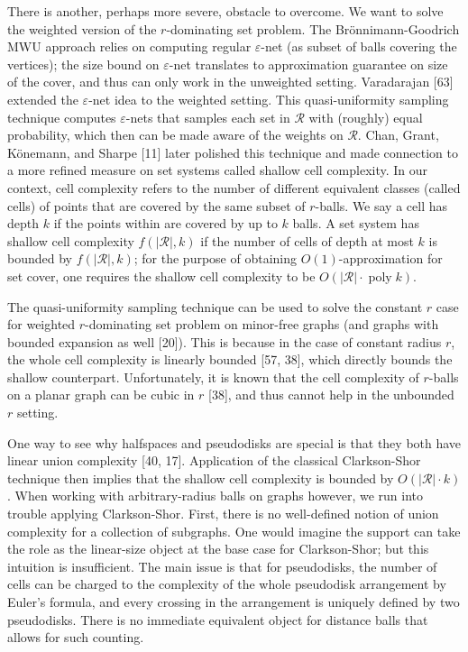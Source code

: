There is another, perhaps more severe, obstacle to overcome. We want to solve the weighted version of the $r$-dominating set problem. The Brönnimann-Goodrich MWU approach relies on computing regular $\varepsilon$-net (as subset of balls covering the vertices); the size bound on $\varepsilon$-net translates to approximation guarantee on size of the cover, and thus can only work in the unweighted setting. Varadarajan [63] extended the $\varepsilon$-net idea to the weighted setting. This quasi-uniformity sampling technique computes $\varepsilon$-nets that samples each set in $\mathcal{R}$ with (roughly) equal probability, which then can be made aware of the weights on $\mathcal{R}$. Chan, Grant, Könemann, and Sharpe [11] later polished this technique and made connection to a more refined measure on set systems called shallow cell complexity. In our context, cell complexity refers to the number of different equivalent classes (called cells) of points that are covered by the same subset of $r$-balls. We say a cell has depth $k$ if the points within are covered by up to $k$ balls. A set system has shallow cell complexity $f(|\mathcal{R}|,k)$ if the number of cells of depth at most $k$ is bounded by $f(|\mathcal{R}|,k)$; for the purpose of obtaining $O(1)$-approximation for set cover, one requires the shallow cell complexity to be $O(|\mathcal{R}|\cdot\operatorname{poly}k)$.
\par
\par
The quasi-uniformity sampling technique can be used to solve the constant $r$ case for weighted $r$-dominating set problem on minor-free graphs (and graphs with bounded expansion as well [20]). This is because in the case of constant radius $r$, the whole cell complexity is linearly bounded [57, 38], which directly bounds the shallow counterpart. Unfortunately, it is known that the cell complexity of $r$-balls on a planar graph can be cubic in $r$ [38], and thus cannot help in the unbounded $r$ setting.
\par
\par
One way to see why halfspaces and pseudodisks are special is that they both have linear union complexity [40, 17]. Application of the classical Clarkson-Shor technique then implies that the shallow cell complexity is bounded by $O(|\mathcal{R}|\cdot k)$. When working with arbitrary-radius balls on graphs however, we run into trouble applying Clarkson-Shor. First, there is no well-defined notion of union complexity for a collection of subgraphs. One would imagine the support can take the role as the linear-size object at the base case for Clarkson-Shor; but this intuition is insufficient. The main issue is that for pseudodisks, the number of cells can be charged to the complexity of the whole pseudodisk arrangement by Euler’s formula, and every crossing in the arrangement is uniquely defined by two pseudodisks. There is no immediate equivalent object for distance balls that allows for such counting.

